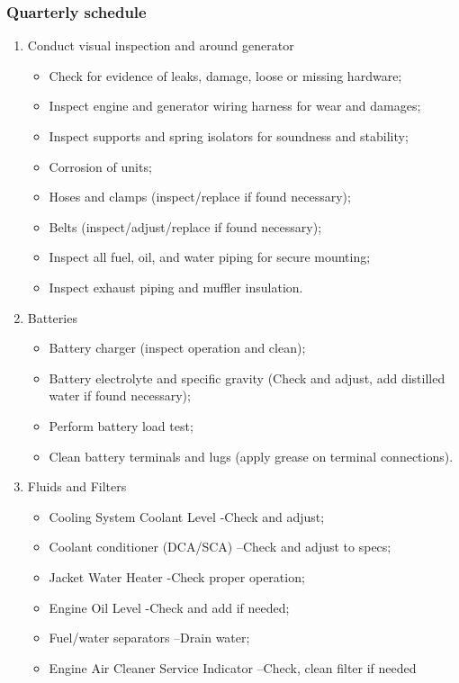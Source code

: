 \subsubsection{Quarterly schedule}
\begin{enumerate}[label=(\alph*)]
\item Conduct visual inspection and around generator
\begin{itemize}
\item Check for evidence of leaks, damage, loose or missing hardware;
\item Inspect engine and generator wiring harness for wear and damages;
\item Inspect supports and spring isolators for soundness and stability;
\item Corrosion of units;
\item Hoses and clamps (inspect/replace if found necessary);
\item Belts (inspect/adjust/replace if found necessary);
\item Inspect all fuel, oil, and water piping for secure mounting;
\item Inspect exhaust piping and muffler insulation.
\end{itemize}


\item Batteries
\begin{itemize}
	\item Battery charger (inspect operation and clean);
	\item Battery electrolyte and specific gravity (Check and adjust, add distilled water if found necessary);
	\item Perform battery load test;
	\item Clean battery terminals and lugs (apply grease on terminal connections).
\end{itemize}

\item Fluids and Filters
\begin{itemize}
	\item Cooling System Coolant Level -Check and adjust;
	\item Coolant conditioner (DCA/SCA) –Check and adjust to specs;
	\item Jacket Water Heater -Check proper operation;
	\item Engine Oil Level -Check and add if needed;
	\item Fuel/water separators –Drain water;
	\item Engine Air Cleaner Service Indicator –Check, clean filter if needed
\end{itemize}


\end{enumerate}
